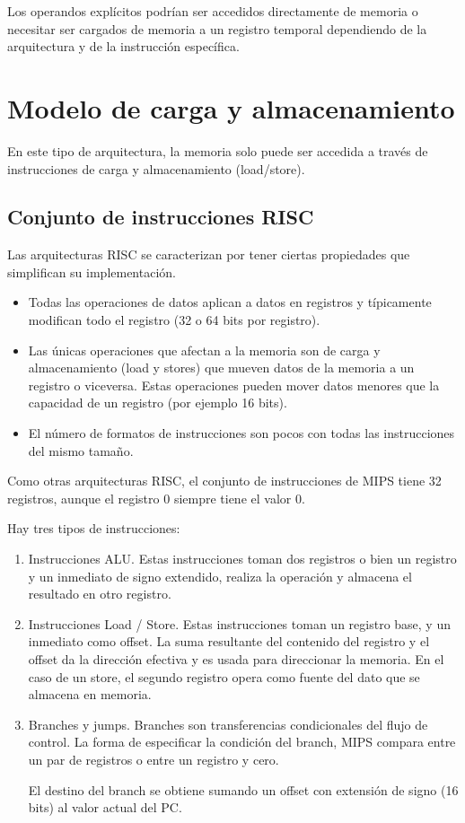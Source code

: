 Los operandos explícitos podrían ser accedidos directamente de memoria o necesitar ser cargados de memoria a un registro temporal dependiendo de la arquitectura y de la instrucción específica.


\section{Modelo de carga y almacenamiento}
En este tipo de arquitectura, la memoria solo puede ser accedida a través de instrucciones de carga y almacenamiento (load/store). 

\subsection{Conjunto de instrucciones RISC}
Las arquitecturas RISC se caracterizan por tener ciertas propiedades que simplifican su implementación.

\begin{itemize}
\item Todas las operaciones de datos aplican a datos en registros y típicamente modifican todo el registro (32 o 64 bits por registro).
\item Las únicas operaciones que afectan a la memoria son de carga y almacenamiento (load y stores) que mueven datos de la memoria a un registro o viceversa. Estas operaciones pueden mover datos menores que la capacidad de un registro (por ejemplo 16 bits).
\item El número de formatos de instrucciones son pocos con todas las instrucciones del mismo tamaño.
\end{itemize}

Como otras arquitecturas RISC, el conjunto de instrucciones de MIPS tiene 32 registros, aunque el registro 0 siempre tiene el valor 0. 

Hay tres tipos de instrucciones:

\begin{enumerate}
\item Instrucciones ALU. Estas instrucciones toman dos registros o bien un registro y un inmediato de signo extendido, realiza la operación y almacena el resultado en otro registro.

\item Instrucciones Load / Store. Estas instrucciones toman un registro base, y un inmediato como offset. La suma resultante del contenido del registro y el offset da la dirección efectiva y es usada para direccionar la memoria. En el caso de un store, el segundo registro opera como fuente del dato que se almacena en memoria.

\item Branches  y  jumps. Branches son transferencias condicionales del flujo de control. La forma de especificar la condición del branch, MIPS compara entre un par de registros o entre un registro y cero.

El destino del branch se obtiene sumando un offset con extensión de signo (16 bits) al valor actual del PC.
\end{enumerate}

